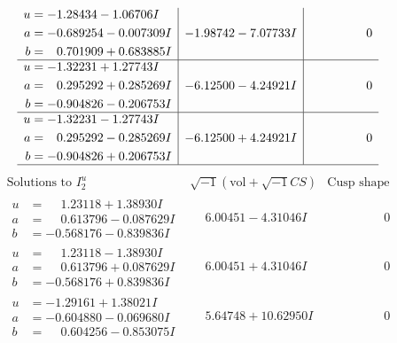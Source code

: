 \documentclass[1p]{elsarticle_modified}
\theoremstyle{definition}
\newcommand{\I}{\sqrt{-1}}
\begin{document}
$$\begin{array}{c|c|c}
\begin{aligned}
u &= -1.28434 - 1.06706 I \\
a &= -0.689254 - 0.007309 I \\
b &= \phantom{-}0.701909 + 0.683885 I\end{aligned}
 & -1.98742 - 7.07733 I & \phantom{-0.000000 } 0 \\ \hline\begin{aligned}
u &= -1.32231 + 1.27743 I \\
a &= \phantom{-}0.295292 + 0.285269 I \\
b &= -0.904826 - 0.206753 I\end{aligned}
 & -6.12500 - 4.24921 I & \phantom{-0.000000 } 0 \\ \hline\begin{aligned}
u &= -1.32231 - 1.27743 I \\
a &= \phantom{-}0.295292 - 0.285269 I \\
b &= -0.904826 + 0.206753 I\end{aligned}
 & -6.12500 + 4.24921 I & \phantom{-0.000000 } 0\\
 \hline 
 \end{array}$$\newpage$$\begin{array}{c|c|c}  
\text{Solutions to }I^u_{2}& \I (\text{vol} + \sqrt{-1}CS) & \text{Cusp shape}\\
 \hline 
\begin{aligned}
u &= \phantom{-}1.23118 + 1.38930 I \\
a &= \phantom{-}0.613796 - 0.087629 I \\
b &= -0.568176 - 0.839836 I\end{aligned}
 & \phantom{-}6.00451 - 4.31046 I & \phantom{-0.000000 } 0 \\ \hline\begin{aligned}
u &= \phantom{-}1.23118 - 1.38930 I \\
a &= \phantom{-}0.613796 + 0.087629 I \\
b &= -0.568176 + 0.839836 I\end{aligned}
 & \phantom{-}6.00451 + 4.31046 I & \phantom{-0.000000 } 0 \\ \hline\begin{aligned}
u &= -1.29161 + 1.38021 I \\
a &= -0.604880 - 0.069680 I \\
b &= \phantom{-}0.604256 - 0.853075 I\end{aligned}
 & \phantom{-}5.64748 + 10.62950 I & \phantom{-0.000000 } 0 \\ \hline\begin{aligned}

\end{aligned}
\end{array}$$
\end{document}
